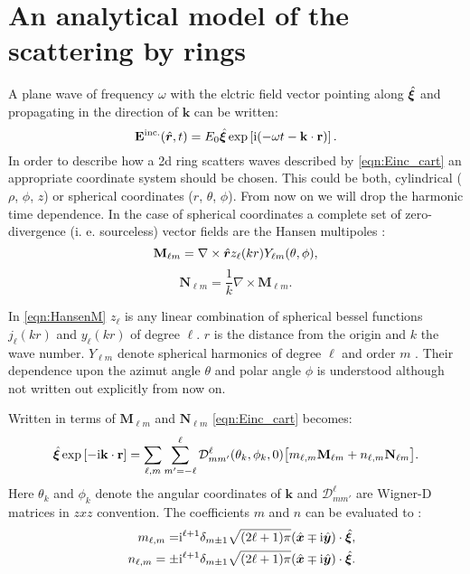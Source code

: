 \section{An analytical model of the scattering by rings}
\label{sec:analytical_ring_scattering}
A plane wave of frequency $\omega$ with the elctric field vector pointing along $\hat{\bm{\xi}}$ and propagating in the direction of $\mathbf{k}$ can be written: 
\begin{equation}
\mathbf{E}^\text{inc.} (\hat{\bm{r}}, t)= E_0 \hat{\bm{\xi}} \exp\left[\mathrm{i} (-\omega t- \mathbf{k}\cdot \mathbf{r})\right].
\label{eqn:Einc_cart}
\end{equation}
In order to describe how a 2d ring scatters waves described by \cref{eqn:Einc_cart} an appropriate coordinate system should be chosen. This could be both, cylindrical ($\rho$, $\phi$, $z$) or spherical coordinates ($r$, $\theta$, $\phi$). From now on we will drop the harmonic time dependence.
In the case of spherical coordinates a complete set of zero-divergence (i. e. sourceless) vector fields are the Hansen multipoles \Cite{Hansen1935}:
\begin{equation}
\mathbf{M}_{\ell m} = \nabla \times \hat{\bm{r}} z_\ell(kr) Y_{\ell m}(\theta, \phi),
\label{eqn:HansenM}
\end{equation}
\begin{equation}
\mathbf{N}_{\ell m} = \frac{1}{k}\nabla \times \mathbf{M}_{\ell m}.
\label{eqn:HansenN}
\end{equation}

In \cref{eqn:HansenM} $z_\ell$ is any linear combination of spherical bessel functions $j_\ell(kr)$ and $y_\ell(kr)$ \Cite{DLMF_Bessel} of degree $\ell$. $r$ is the distance from the origin and $k$ the wave number. $Y_{\ell m}$ denote spherical harmonics of degree $\ell$ and order $m$ \Cite{DLMF_SphericalHarmonics}. Their dependence upon the azimut angle $\theta$ and polar angle $\phi$ is understood although not written out explicitly from now on.

Written in terms of $\mathbf{M}_{\ell m}$ and $\mathbf{N}_{\ell m}$ \cref{eqn:Einc_cart} becomes:
\begin{equation}
\hat{\bm{\xi}} \exp\left[-\mathrm{i}  \mathbf{k}\cdot \mathbf{r}\right] =\sum_{\ell,m} \sum_{m'=-\ell}^\ell\mathcal{D}_{m m'}^\ell (\theta_k, \phi_k,0)\big[
m_{\ell, m} \mathbf{M}_{\ell m} +n_{\ell,m} \mathbf{N}_{\ell m}\big].
\end{equation}
Here $\theta_k$ and $\phi_k$ denote the angular coordinates of $\mathbf{k}$ and $\mathcal{D}_{m m'}^\ell$ are Wigner-D matrices in $zxz$ convention. The coefficients $m$ and $n$ can be evaluated to \Cite{Kristensson2014}:
\begin{align}
&& m_{\ell,m} = &\mathrm{i}^{\ell+1} \delta_{m\pm 1}\sqrt{(2\ell+1)\pi} 
(\hat{\bm{x}}\mp\mathrm{i} \hat{\bm{y}})\cdot \hat{\bm{\xi}},\\
&& n_{\ell,m} = \pm&\mathrm{i}^{\ell+1} \delta_{m\pm 1}\sqrt{(2\ell+1)\pi} 
(\hat{\bm{x}}\mp\mathrm{i} \hat{\bm{y}})\cdot \hat{\bm{\xi}}.
\end{align}

